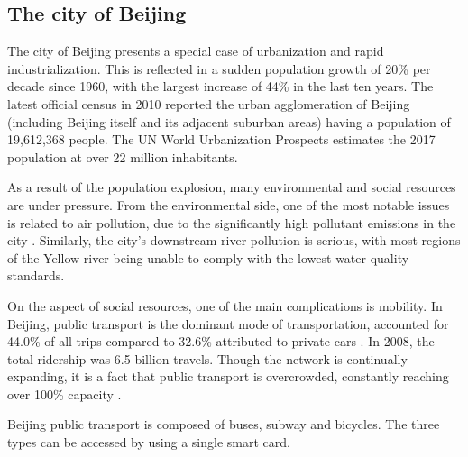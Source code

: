 \documentclass{article}
\begin{document}
\subsection{The city of Beijing}
The city of Beijing presents a special case of urbanization and rapid industrialization. This is reflected in a sudden population growth of 20\% per decade since 1960, with the largest increase of 44\% in the last ten years. The latest official census in 2010 reported the urban agglomeration of Beijing (including Beijing itself and its adjacent suburban areas) having a population of 19,612,368 people. The UN World Urbanization Prospects estimates the 2017 population at over 22 million inhabitants. \cite{world2016beijing}

As a result of the population explosion, many environmental and social resources are under pressure. From the environmental side, one of the most notable issues is related to air pollution, due to the significantly high pollutant emissions in the city \cite{zhang2016air}. Similarly, the city's downstream river pollution is serious, with most regions of the Yellow river being unable to comply with the lowest water quality standards. \cite{wang2015studies} 

On the aspect of social resources, one of the main complications is mobility. In Beijing, public transport is the dominant mode of transportation, accounted for 44.0\% of all trips compared to 32.6\% attributed to private cars \cite{mao2016commuting}. In 2008, the total ridership was 6.5 billion travels. Though the network is continually expanding, it is a fact that public transport is overcrowded, constantly reaching over 100\% capacity \cite{beijing2009research}.

Beijing public transport is composed of buses, subway and bicycles. The three types can be accessed by using a single smart card. 
\end{document}
